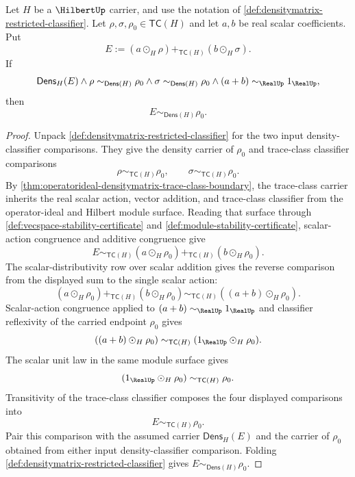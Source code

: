 \begin{lemma}
\label{lem:densitymatrix-binary-constant-affine-exactness}
Let $H$ be a $\HilbertUp$ carrier, and use the notation of \autoref{def:densitymatrix-restricted-classifier}. Let $\rho,\sigma,\rho_0\in\mathsf{TC}(H)$ and let $a,b$ be real scalar coefficients. Put
$$
E:=(a\odot_H\rho)+_{\mathsf{TC}(H)}(b\odot_H\sigma).
$$
If
$$
\mathsf{Dens}_H(E)
\land
\rho\sim_{\mathsf{Dens}(H)}\rho_0
\land
\sigma\sim_{\mathsf{Dens}(H)}\rho_0
\land
(a+b)\sim_{\RealUp}1_{\RealUp},
$$
then
$$
E\sim_{\mathsf{Dens}(H)}\rho_0.
$$
\end{lemma}
\begin{proof}
Unpack \autoref{def:densitymatrix-restricted-classifier} for the two input density-classifier comparisons. They give the density carrier of $\rho_0$ and trace-class classifier comparisons
$$
\rho\sim_{\mathsf{TC}(H)}\rho_0,
\qquad
\sigma\sim_{\mathsf{TC}(H)}\rho_0.
$$
By \autoref{thm:operatorideal-densitymatrix-trace-class-boundary}, the trace-class carrier inherits the real scalar action, vector addition, and trace-class classifier from the operator-ideal and Hilbert module surface. Reading that surface through \autoref{def:vecspace-stability-certificate} and \autoref{def:module-stability-certificate}, scalar-action congruence and additive congruence give
$$
E\sim_{\mathsf{TC}(H)}
(a\odot_H\rho_0)+_{\mathsf{TC}(H)}(b\odot_H\rho_0).
$$
The scalar-distributivity row over scalar addition gives the reverse comparison from the displayed sum to the single scalar action:
$$
(a\odot_H\rho_0)+_{\mathsf{TC}(H)}(b\odot_H\rho_0)
\sim_{\mathsf{TC}(H)}
((a+b)\odot_H\rho_0).
$$
Scalar-action congruence applied to $(a+b)\sim_{\RealUp}1_{\RealUp}$ and classifier reflexivity of the carried endpoint $\rho_0$ gives
$$
((a+b)\odot_H\rho_0)
\sim_{\mathsf{TC}(H)}
(1_{\RealUp}\odot_H\rho_0).
$$
The scalar unit law in the same module surface gives
$$
(1_{\RealUp}\odot_H\rho_0)\sim_{\mathsf{TC}(H)}\rho_0.
$$
Transitivity of the trace-class classifier composes the four displayed comparisons into
$$
E\sim_{\mathsf{TC}(H)}\rho_0.
$$
Pair this comparison with the assumed carrier $\mathsf{Dens}_H(E)$ and the carrier of $\rho_0$ obtained from either input density-classifier comparison. Folding \autoref{def:densitymatrix-restricted-classifier} gives $E\sim_{\mathsf{Dens}(H)}\rho_0$.
\end{proof}

